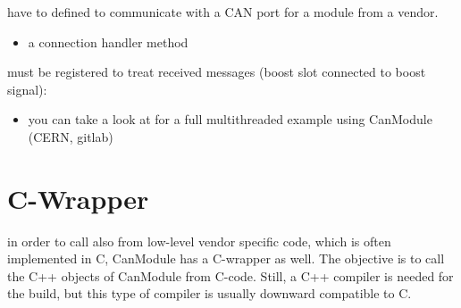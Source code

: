 \documentclass[letterpaper,10pt,english]{sphinxmanual}
\begin{document}
have to defined to communicate with a CAN port for a module from a vendor.
\begin{itemize}
\item {} 
a connection handler method

\end{itemize}

must be registered to treat received messages (boost slot connected to boost signal):

\begin{sphinxVerbatim}[commandchars=\\\{\}]
 
  
          
\end{sphinxVerbatim}

\begin{sphinxVerbatim}[commandchars=\\\{\}]
 
    
        
     
\end{sphinxVerbatim}
\begin{itemize}
\item {} 
you can take a look at  for a full multithreaded example using CanModule (CERN, gitlab)

\end{itemize}


\chapter{C-Wrapper}
\label{\detokenize{cwrapper:c-wrapper}}\label{\detokenize{cwrapper::doc}}
in order to call  also from low-level vendor specific code, which is often implemented
in C, CanModule has a C-wrapper as well. The objective is to call the C++ objects of CanModule
from C-code. Still, a C++ compiler is needed for the build, but this type of
compiler is usually downward compatible to C.
\end{document}
